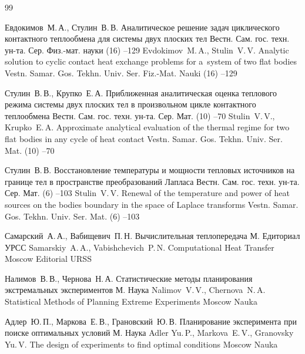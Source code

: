 \begin{thebibliography}{99}

\by Евдокимов~М.\,А., Стулин~В.\,В.
\paper Аналитическое решение задач циклического контактного теплообмена для системы двух плоских тел
\jour Вестн. Сам. гос. техн. ун-та. Сер. Физ.-мат. науки
(16)
--129
\misctransl
\by Evdokimov~M.\,A., Stulin~V.\,V.
\paper Analytic solution to cyclic contact heat exchange problems for a~system of two flat bodies
\jour Vestn. Samar. Gos. Tekhn. Univ. Ser. Fiz.-Mat. Nauki
(16)
--129


\by Стулин~В.\,В., Крупко~Е.\,А.
\paper Приближенная аналитическая оценка теплового режима системы двух плоских тел в произвольном цикле контактного теплообмена
\jour Вестн. Сам. гос. техн. ун-та. Сер. Мат.
(10)
--70
\misctransl
\by Stulin~V.\,V., Krupko~E.\,A.
\paper Approximate analytical evaluation of the thermal regime for two flat bodies in any cycle of heat contact 
\jour Vestn. Samar. Gos. Tekhn. Univ. Ser. Mat.
(10)
--70


\by Стулин~В.\,В.
\paper Восстановление температуры и мощности тепловых источников на границе тел в пространстве преобразований
Лапласа
\jour Вестн. Сам. гос. техн. ун-та. Сер. Мат.
(6)
--103
\misctransl
\by Stulin~V.\,V.
\paper Renewal of the temperature and power of heat sources on the bodies boundary in the space of Laplace transforms
\jour Vestn. Samar. Gos. Tekhn. Univ. Ser. Mat.
(6)
--103


\by Самарский~А.\,А., Вабищевич~П.\,Н.
\book Вычислительная теплопередача
\publaddr М.
\publ Едиториал УРСС
\misctransl
\by Samarskiy~A.\,A., Vabishchevich~P.\,N.
\book Computational Heat Transfer
\publaddr Moscow
\publ Editorial URSS


\by Налимов~В.\,В., Чернова~Н.\,А.
\book Статистические методы планирования экстремальных экспериментов
\publaddr М.
\publ Наука
\misctransl
\by Nalimov~V.\,V., Chernova~N.\,A.
\book Statistical Methods of Planning Extreme Experiments
\publaddr Moscow
\publ Nauka

\by Адлер~Ю.\,П., Маркова~Е.\,В., Грановский~Ю.\,В.
\book Планирование эксперимента при поиске оптимальных условий
\publaddr М.
\publ Наука
\misctransl
\by Adler Yu.\,P., Markova~E.\,V., Granovsky Yu.\,V.
\book The design of experiments to find optimal conditions
\publaddr Moscow
\publ Nauka


\end{thebibliography}
